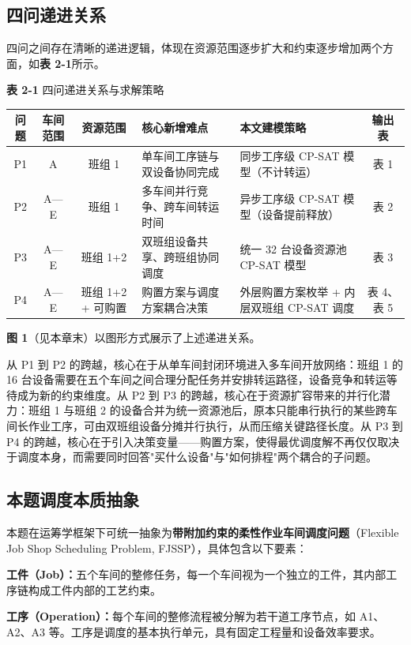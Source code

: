\documentclass[UTF8,a4paper,12pt]{ctexart}
\begin{document}
\subsection{四问递进关系}
四问之间存在清晰的递进逻辑，体现在资源范围逐步扩大和约束逐步增加两个方面，如\textbf{表 2-1}所示。

\textbf{表 2-1} 四问递进关系与求解策略
\begin{center}
\begin{tabular}{|c|c|c|l|l|c|}
\hline
问题 & 车间范围 & 资源范围 & 核心新增难点 & 本文建模策略 & 输出表 \\
\hline
P1 & A & 班组 1 & 单车间工序链与双设备协同完成 & 同步工序级 CP-SAT 模型（不计转运） & 表 1 \\
\hline
P2 & A—E & 班组 1 & 多车间并行竞争、跨车间转运时间 & 异步工序级 CP-SAT 模型（设备提前释放） & 表 2 \\
\hline
P3 & A—E & 班组 1+2 & 双班组设备共享、跨班组协同调度 & 统一 32 台设备资源池 CP-SAT 模型 & 表 3 \\
\hline
P4 & A—E & 班组 1+2 + 可购置 & 购置方案与调度方案耦合决策 & 外层购置方案枚举 + 内层双班组 CP-SAT 调度 & 表 4、表 5 \\
\hline
\end{tabular}
\end{center}

\textbf{图 1}（见本章末）以图形方式展示了上述递进关系。

从 P1 到 P2 的跨越，核心在于从单车间封闭环境进入多车间开放网络：班组 1 的 16 台设备需要在五个车间之间合理分配任务并安排转运路径，设备竞争和转运等待成为新的约束维度。从 P2 到 P3 的跨越，核心在于资源扩容带来的并行化潜力：班组 1 与班组 2 的设备合并为统一资源池后，原本只能串行执行的某些跨车间长作业工序，可由双班组设备分摊并行执行，从而压缩关键路径长度。从 P3 到 P4 的跨越，核心在于引入决策变量——购置方案，使得最优调度解不再仅仅取决于调度本身，而需要同时回答"买什么设备"与"如何排程"两个耦合的子问题。

\subsection{本题调度本质抽象}
本题在运筹学框架下可统一抽象为\textbf{带附加约束的柔性作业车间调度问题}（Flexible Job Shop Scheduling Problem, FJSSP），具体包含以下要素：

\textbf{工件（Job）：}五个车间的整修任务，每一个车间视为一个独立的工件，其内部工序链构成工件内部的工艺约束。

\textbf{工序（Operation）：}每个车间的整修流程被分解为若干道工序节点，如 A1、A2、A3 等。工序是调度的基本执行单元，具有固定工程量和设备效率要求。
\end{document}
